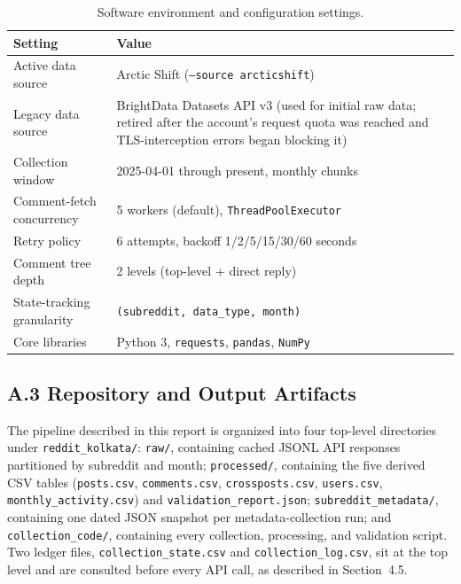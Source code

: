 \documentclass[12pt]{article}
\begin{document}
\begin{table}[h]
\centering
\caption{Software environment and configuration settings.}
\label{tab:env}
\begin{tabular}{@{}lp{9cm}@{}}
\toprule
\textbf{Setting} & \textbf{Value} \\
\midrule
Active data source & Arctic Shift (\texttt{--source arcticshift}) \\
Legacy data source & BrightData Datasets API v3 (used for initial raw data; retired after the
account's request quota was reached and TLS-interception errors began blocking it) \\
Collection window & 2025-04-01 through present, monthly chunks \\
Comment-fetch concurrency & 5 workers (default), \texttt{ThreadPoolExecutor} \\
Retry policy & 6 attempts, backoff 1/2/5/15/30/60 seconds \\
Comment tree depth & 2 levels (top-level + direct reply) \\
State-tracking granularity & \texttt{(subreddit, data\_type, month)} \\
Core libraries & Python 3, \texttt{requests}, \texttt{pandas}, \texttt{NumPy} \\
\bottomrule
\end{tabular}
\end{table}

\subsection*{A.3 Repository and Output Artifacts}
The pipeline described in this report is organized into four top-level directories under
\texttt{reddit\_kolkata/}: \texttt{raw/}, containing cached JSONL API responses partitioned by
subreddit and month; \texttt{processed/}, containing the five derived CSV tables
(\texttt{posts.csv}, \texttt{comments.csv}, \texttt{crossposts.csv}, \texttt{users.csv},
\texttt{monthly\_activity.csv}) and \texttt{validation\_report.json}; \texttt{subreddit\_metadata/},
containing one dated JSON snapshot per metadata-collection run; and \texttt{collection\_code/},
containing every collection, processing, and validation script. Two ledger files,
\texttt{collection\_state.csv} and \texttt{collection\_log.csv}, sit at the top level and are
consulted before every API call, as described in Section~4.5.

\end{document}
